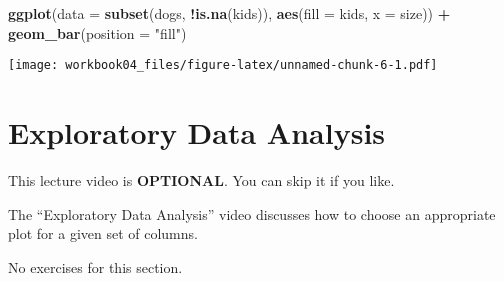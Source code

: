 \documentclass[
]{article}
\newenvironment{Shaded}{\begin{snugshade}}{\end{snugshade}}
\newcommand{\DataTypeTok}[1]{\textcolor[rgb]{0.13,0.29,0.53}{#1}}
\newcommand{\KeywordTok}[1]{\textcolor[rgb]{0.13,0.29,0.53}{\textbf{#1}}}
\newcommand{\NormalTok}[1]{#1}
\newcommand{\OperatorTok}[1]{\textcolor[rgb]{0.81,0.36,0.00}{\textbf{#1}}}
\newcommand{\StringTok}[1]{\textcolor[rgb]{0.31,0.60,0.02}{#1}}
\begin{document}
\begin{Shaded}
\begin{Highlighting}[]
\KeywordTok{ggplot}\NormalTok{(}\DataTypeTok{data =} \KeywordTok{subset}\NormalTok{(dogs, }\OperatorTok{!}\KeywordTok{is.na}\NormalTok{(kids)), }\KeywordTok{aes}\NormalTok{(}\DataTypeTok{fill =}\NormalTok{ kids, }\DataTypeTok{x =}\NormalTok{ size)) }\OperatorTok{+}
\StringTok{   }\KeywordTok{geom\_bar}\NormalTok{(}\DataTypeTok{position =} \StringTok{"fill"}\NormalTok{)}
\end{Highlighting}
\end{Shaded}

\texttt{[image: workbook04\_files/figure-latex/unnamed-chunk-6-1.pdf]}

\hypertarget{exploratory-data-analysis}{%
\section{Exploratory Data Analysis}\label{exploratory-data-analysis}}

This lecture video is \textbf{OPTIONAL}. You can skip it if you like.

The ``Exploratory Data Analysis'' video discusses how to choose an
appropriate plot for a given set of columns.

No exercises for this section.
\end{document}
